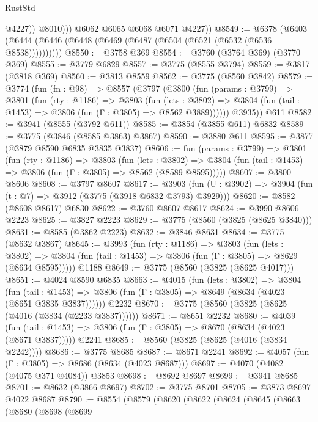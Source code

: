 \begin{lexlean}{RustStd}
\begin{coremodule}
{\begin{coremodule}
{{{{{{{{{{{{{{{{{{{{{{{{{{{{{{{                  @4227))
              @8010)))
        @6062
        @6065
        @6068
        @6071
        @4227))
@8549 := @6378 (@6403 (@6444 (@6446 (@6448 (@6469 (@6487 (@6504 (@6521 (@6532 (@6536 @8538))))))))))
@8550 := @3758 @369
@8554 := @3760 (@3764 @369) (@3770 @369)
@8555 := @3779 @6829
@8557 := @3775 (@8555 @3794)
@8559 := @3817 (@3818 @369)
@8560 := @3813 @8559
@8562 := @3775 (@8560 @3842)
@8579 := @3774
    (fun (fn : @98) =>
    @8557
      (@3797
        (@3800
          (fun (params : @3799) =>
          @3801
            (fun (rty : @1186) =>
            @3803
              (fun (lets : @3802) =>
              @3804 (fun (tail : @1453) => @3806 (fun (Γ : @3805) => @8562 @3889))))))
        @3935))
    @611
@8582 := @3941 (@8555 (@3792 @611))
@8585 := @3854 (@3855 @611) @6832
@8589 := @3775 (@3846 (@8585 @3863) @3867)
@8590 := @3880 @611
@8595 := @3877 (@3879 @8590 @6835 @3835 @3837)
@8606 := fun (params : @3799) =>
  @3801
    (fun (rty : @1186) =>
    @3803
      (fun (lets : @3802) =>
      @3804 (fun (tail : @1453) => @3806 (fun (Γ : @3805) => @8562 (@8589 @8595)))))
@8607 := @3800 @8606
@8608 := @3797 @8607
@8617 := @3903 (fun (U : @3902) => @3904 (fun (t : @7) => @3912 (@3775 (@3918 @6832 @3793) @3929)))
@8620 := @8582 (@8608 @8617) @6830
@8622 := @3760 @8607 @8617
@8624 := @3990 @8606 @2223
@8625 := @3827 @2223
@8629 := @3775 (@8560 (@3825 (@8625 @3840)))
@8631 := @8585 (@3862 @2223)
@8632 := @3846 @8631
@8634 := @3775 (@8632 @3867)
@8645 := @3993
    (fun (rty : @1186) =>
    @3803
      (fun (lets : @3802) =>
      @3804 (fun (tail : @1453) => @3806 (fun (Γ : @3805) => @8629 (@8634 @8595)))))
    @1188
@8649 := @3775 (@8560 (@3825 (@8625 @4017)))
@8651 := @4024 @8590 @6835
@8663 := @4015
    (fun (lets : @3802) =>
    @3804
      (fun (tail : @1453) => @3806 (fun (Γ : @3805) => @8649 (@8634 (@4023 (@8651 @3835 @3837))))))
    @2232
@8670 := @3775 (@8560 (@3825 (@8625 (@4016 (@3834 (@2233 @3837))))))
@8671 := @8651 @2232
@8680 := @4039
    (fun (tail : @1453) => @3806 (fun (Γ : @3805) => @8670 (@8634 (@4023 (@8671 @3837)))))
    @2241
@8685 := @8560 (@3825 (@8625 (@4016 (@3834 @2242))))
@8686 := @3775 @8685
@8687 := @8671 @2241
@8692 := @4057 (fun (Γ : @3805) => @8686 (@8634 (@4023 @8687)))
@8697 := @4070 (@4082 (@4075 @371 @4084)) @3853
@8698 := @8692 @8697
@8699 := @3941 @8685
@8701 := @8632 (@3866 @8697)
@8702 := @3775 @8701
@8705 := @3873 @8697 @4022 @8687
@8790 := @8554
    (@8579
      (@8620
        (@8622
          (@8624
            (@8645
              (@8663
                (@8680
                  (@8698
                    (@8699
}}}}}}}}}}}}}}}}}}}}}}}}}}}}}}}
\end{coremodule}}
\end{coremodule}
\end{lexlean}
